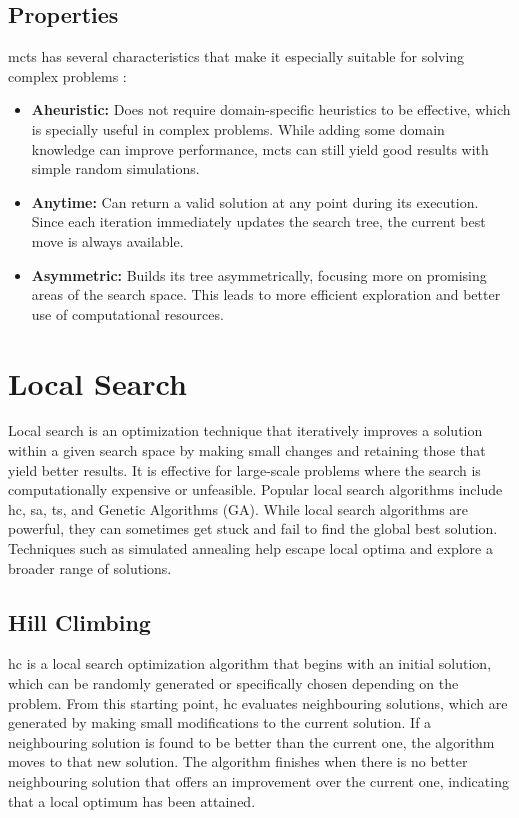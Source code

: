 \subsection{Properties}

\ac{mcts} has several characteristics that make it especially suitable for solving complex problems \cite{browne_survey_2012}:

\begin{itemize}
\item \textbf{Aheuristic:} Does not require domain-specific heuristics to be effective, which is specially useful in complex problems. While adding some domain knowledge can improve performance, \ac{mcts} can still yield good results with simple random simulations.

\item \textbf{Anytime:} Can return a valid solution at any point during its execution. Since each iteration immediately updates the search tree, the current best move is always available.

\item \textbf{Asymmetric:} Builds its tree asymmetrically, focusing more on promising areas of the search space. This leads to more efficient exploration and better use of computational resources.
\end{itemize}

\section{Local Search}

Local search is an optimization technique that iteratively improves a solution within a given search space by making small changes and retaining those that yield better results. It is effective for large-scale problems where the search is computationally expensive or unfeasible. Popular local search algorithms include \ac{hc}, \ac{sa}, \ac{ts}, and Genetic Algorithms (GA). While local search algorithms are powerful, they can sometimes get stuck and fail to find the global best solution. Techniques such as simulated annealing help escape local optima and explore a broader range of solutions.

\subsection{Hill Climbing}

\ac{hc} is a local search optimization algorithm that begins with an initial solution, which can be randomly generated or specifically chosen depending on the problem. From this starting point, \ac{hc} evaluates neighbouring solutions, which are generated by making small modifications to the current solution. If a neighbouring solution is found to be better than the current one, the algorithm moves to that new solution. The algorithm finishes when there is no better neighbouring solution that offers an improvement over the current one, indicating that a local optimum has been attained. 

